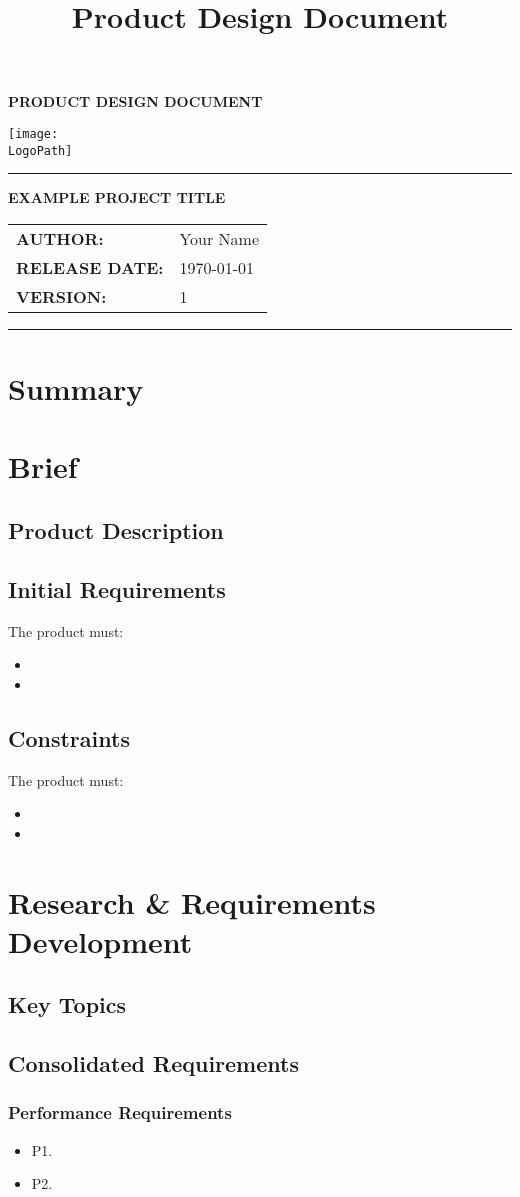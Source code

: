 \documentclass[10pt]{article}
\title{Product Design Document}
\author{\AuthorName}
\date{\ReleaseDate}
\makeatletter
\newcommand{\ProjectTitle}{EXAMPLE PROJECT TITLE}
\newcommand{\AuthorName}{Your Name}
\newcommand{\ReleaseDate}{\today}
\newcommand{\LogoPath}{logo.pdf}
\newcommand{\DocVersion}{1}
\newcommand{\customtitle}{%
  \noindent
  \begin{minipage}[t]{0.65\textwidth}
    \vspace{-0.5cm}  %
    {\ocrfamily\Large\bfseries PRODUCT DESIGN DOCUMENT \par}
  \end{minipage}%
  \begin{minipage}[t]{0.35\textwidth}
    \flushright{}
    \texttt{[image: \\LogoPath]}
  \end{minipage}
  
  \vspace{0.3cm}
  \hrule height 0.8pt
  \vspace{0.5cm}
  
  {\ocrfamily\large\bfseries\ProjectTitle\par}
  
  \vspace{0.5cm}
  \begin{tabular}{@{}ll@{}}
    {\ocrfamily\textbf{AUTHOR:}} & {\ocrfamily{} \AuthorName} \\
    {\ocrfamily\textbf{RELEASE DATE:}} & {\ocrfamily{} \ReleaseDate} \\
    {\ocrfamily\textbf{VERSION:}} & {\ocrfamily{} \DocVersion} \\
  \end{tabular}
  
  \vspace{0.5cm}
  \hrule height 0.8pt
  \vspace{0.25cm}
}
\makeatother
\begin{document}
\vspace*{-1cm}
\thispagestyle{plain}
\customtitle{}



\section{Summary}

\section{Brief}
\subsection{Product Description}

\subsection{Initial Requirements}
The product must:
\begin{itemize}[leftmargin=*]
    \item
    \item
\end{itemize}

\subsection{Constraints}
The product must:
\begin{itemize}[leftmargin=*]
    \item
    \item
\end{itemize}

\section{Research \& Requirements Development}
\subsection{Key Topics}

\subsection{Consolidated Requirements}
\subsubsection{Performance Requirements}
\begin{itemize}[leftmargin=*]
    \item P1.
    \item P2.
\end{itemize}
\end{document}
